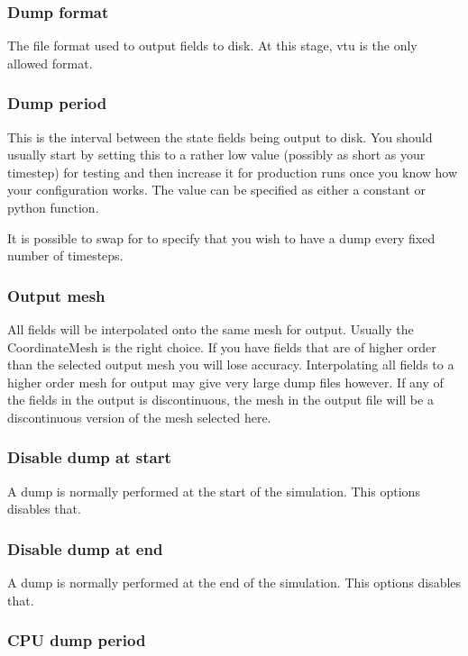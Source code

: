 \subsubsection{Dump format}
The file format used to output fields to disk. At this stage, vtu is the
only allowed format.

\subsubsection{Dump period}
This is the interval between the state fields being output to disk. You should usually start by setting this to a rather low value (possibly as short as your timestep) for testing and then increase it for production runs once you know how your configuration works. The value can be specified as either a constant or python function.

It is possible to swap  for  to specify that you wish to have a dump every fixed number of timesteps.

\subsubsection{Output mesh}

All fields will be interpolated onto the same mesh for output. Usually the
CoordinateMesh is the right choice. If you have fields that are of
higher order than the selected output mesh you will lose 
accuracy. Interpolating all fields to a higher order mesh for output may give
very large dump files however. If any 
of the fields in the output is discontinuous, the mesh in the output file
will be a discontinuous version of the mesh selected here.

\subsubsection{Disable dump at start}

A dump is normally performed at the start of the simulation. This options disables that.

\subsubsection{Disable dump at end}

A dump is normally performed at the end of the simulation. This options disables that.

\subsubsection{CPU dump period}


